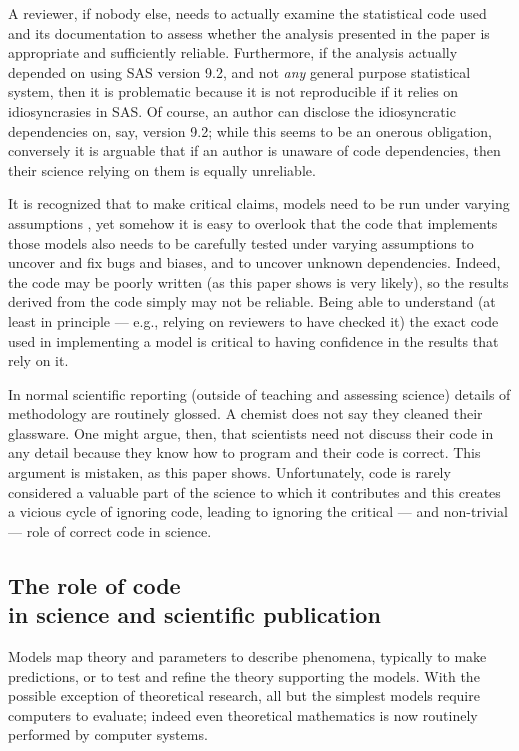 \documentclass{comjnl}
\begin{document}
A reviewer, if nobody else, needs to actually examine the statistical code used and its documentation to assess whether the analysis presented in the paper is appropriate and sufficiently reliable. Furthermore, if the analysis actually depended on using SAS version 9.2, and not \emph{any\/} general purpose statistical system, then it is problematic because it is not reproducible if it relies on idiosyncrasies in SAS\@. Of course, an author can disclose the idiosyncratic dependencies on, say, version 9.2; while this seems to be an onerous obligation, conversely it is arguable that if an author is unaware of code dependencies, then their science relying on them is equally unreliable.

It is recognized that to make critical claims, models need to be run under varying assumptions \cite{whitty}, yet somehow it is easy to overlook that the code that implements those models also needs to be carefully tested under varying assumptions to uncover and fix bugs and biases, and to uncover unknown dependencies. Indeed, the code may be poorly written (as this paper shows is very likely), so the results derived from the code simply may not be reliable. Being able to understand (at least in principle --- e.g., relying on reviewers to have checked it) the exact code used in implementing a model is critical to having confidence in the results that rely on it.

In normal scientific reporting (outside of teaching and assessing science) details of methodology are routinely glossed. A chemist does not say they cleaned their glassware. One might argue, then, that scientists need not discuss their code in any detail because they know how to program and their code is correct. This argument is mistaken, as this paper shows. Unfortunately, code is rarely considered a valuable part of the science to which it contributes and this creates a vicious cycle of ignoring code, leading to ignoring the critical --- and non-trivial --- role of correct code in science. 

\subsection{The role of code \\ in science and scientific publication}

Models map theory and parameters to describe phenomena, typically to make predictions, or to test and refine the theory supporting the models. With the possible exception of theoretical research, all but the simplest models require computers to evaluate; indeed even theoretical mathematics is now routinely performed by computer systems.
\end{document}
